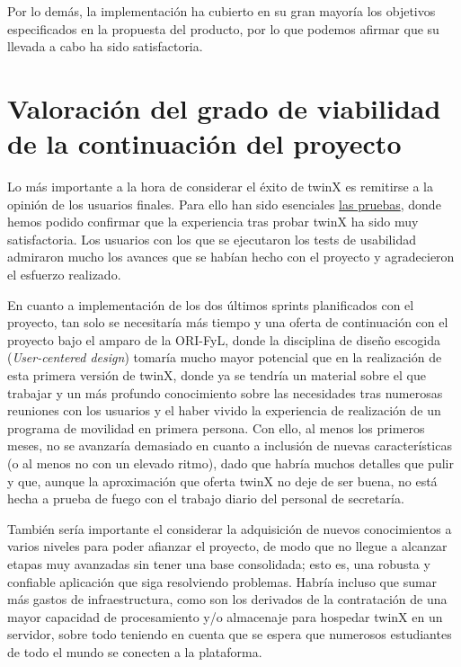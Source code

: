 Por lo demás, la implementación ha cubierto en su gran mayoría los objetivos especificados en la propuesta del producto, por lo que podemos afirmar que su llevada a cabo ha sido satisfactoria.

\section{Valoración del grado de viabilidad de la continuación del proyecto}

Lo más importante a la hora de considerar el éxito de twinX es remitirse a la opinión de los usuarios finales. Para ello han sido esenciales \hyperref[pruebas]{las pruebas}, donde hemos podido confirmar que la experiencia tras probar twinX ha sido muy satisfactoria. Los usuarios con los que se ejecutaron los tests de usabilidad admiraron mucho los avances que se habían hecho con el proyecto y agradecieron el esfuerzo realizado.

En cuanto a implementación de los dos últimos sprints planificados con el proyecto, tan solo se necesitaría más tiempo y una oferta de continuación con el proyecto bajo el amparo de la ORI-FyL, donde la disciplina de diseño escogida (\textit{User-centered design}) tomaría mucho mayor potencial que en la realización de esta primera versión de twinX, donde ya se tendría un material sobre el que trabajar y un más profundo conocimiento sobre las necesidades tras numerosas reuniones con los usuarios y el haber vivido la experiencia de realización de un programa de movilidad en primera persona. Con ello, al menos los primeros meses, no se avanzaría demasiado en cuanto a inclusión de nuevas características (o al menos no con un elevado ritmo), dado que habría muchos detalles que pulir y que, aunque la aproximación que oferta twinX no deje de ser buena, no está hecha a prueba de fuego con el trabajo diario del personal de secretaría.

También sería importante el considerar la adquisición de nuevos conocimientos a varios niveles para poder afianzar el proyecto, de modo que no llegue a alcanzar etapas muy avanzadas sin tener una base consolidada; esto es, una robusta y confiable aplicación que siga resolviendo problemas. Habría incluso que sumar más gastos de infraestructura, como son los derivados de la contratación de una mayor capacidad de procesamiento y/o almacenaje para hospedar twinX en un servidor, sobre todo teniendo en cuenta que se espera que numerosos estudiantes de todo el mundo se conecten a la plataforma.

